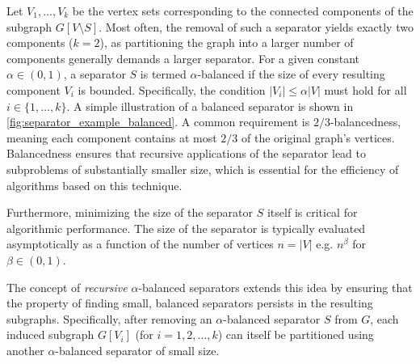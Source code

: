 Let \(V_1, \dots, V_k\) be the vertex sets corresponding to the connected components of the subgraph \(G[V \setminus S]\).
Most often, the removal of such a separator yields exactly two components (\(k=2\)), as partitioning the graph into a larger number of components generally demands a larger separator.
For a given constant \(\alpha \in (0, 1)\), a separator \(S\) is termed \(\alpha\)-balanced if the size of every resulting component \(V_i\) is bounded.
Specifically, the condition \(|V_i| \leq \alpha |V|\) must hold for all \(i \in \{1, \dots, k\}\).
A simple illustration of a balanced separator is shown in \cref{fig:separator_example_balanced}.
A common requirement is \(2/3\)-balancedness, meaning each component contains at most \(2/3\) of the original graph's vertices.
Balancedness ensures that recursive applications of the separator lead to subproblems of substantially smaller size, which is essential for the efficiency of algorithms based on this technique.

Furthermore, minimizing the size of the separator \(S\) itself is critical for algorithmic performance.
The size of the separator is typically evaluated asymptotically as a function of the number of vertices \(n = |V|\) e.g. \(n^\beta\) for \(\beta \in (0,1)\).

The concept of \emph{recursive} \(\alpha\)-balanced separators extends this idea by ensuring that the property of finding small, balanced separators persists in the resulting subgraphs.
Specifically, after removing an \(\alpha\)-balanced separator \(S\) from \(G\), each induced subgraph \(G[V_i]\) (for \(i = 1, 2, \dots, k\)) can itself be partitioned using another \(\alpha\)-balanced separator of small size.

